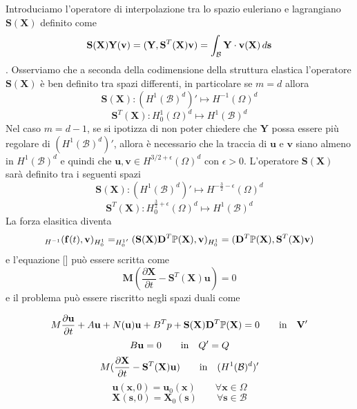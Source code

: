 Introduciamo l'operatore di interpolazione tra lo spazio euleriano e lagrangiano $\mathbf{S}(\mathbf{X})$ definito come
$$\mathbf{S}(\mathbf{X})\mathbf{Y}(\mathbf{v}) = \ps{\mathbf{Y}}{\mathbf{S}^T(\mathbf{X})\mathbf{v}} = \int_\mathcal{B}\mathbf{Y}\cdot\mathbf{v}(\mathbf{X})\, d\mathbf{s}$$.
Osserviamo che a seconda della codimensione della struttura elastica l'operatore $\mathbf{S}(\mathbf{X})$ è ben definito tra spazi differenti, in particolare se $m=d$ allora 
\begin{equation}
\mathbf{S}(\mathbf{X}):(H^1(\mathcal{B})^d)'\mapsto H^{-1}(\Omega)^d
\end{equation}
\begin{equation}
\mathbf{S}^T(\mathbf{X}):H^1_0(\Omega)^d\mapsto H^{1}(\mathcal{B})^d
\end{equation}
Nel caso $m=d-1$, se si ipotizza di non poter chiedere che $\mathbf{Y}$ possa essere più regolare di $(H^1(\mathcal{B})^d)'$, allora è necessario che la traccia di $\mathbf{u}$ e $\mathbf{v}$ siano almeno in $H^1(\mathcal{B})^d$ e quindi che $\mathbf{u},\mathbf{v}\in H^{3/2+\epsilon}(\Omega)^d$ con $\epsilon>0$.
L'operatore $\mathbf{S}(\mathbf{X})$ sarà definito tra i seguenti spazi
\begin{equation}
\mathbf{S}(\mathbf{X}):(H^1(\mathcal{B})^d)'\mapsto H^{-\frac{3}{2}-\epsilon}(\Omega)^d
\end{equation}
\begin{equation}
\mathbf{S}^T(\mathbf{X}):H^{\frac{3}{2}+\epsilon}_0(\Omega)^d\mapsto H^{1}(\mathcal{B})^d
\end{equation}
La forza elasitica diventa
\begin{equation}
\ps{\mathbf{f}(t)}{\mathbf{v}}[H^{-1}][H^1_0] = \ps{\mathbf{S}(\mathbf{X})\mathbf{D}^T\mathbb{P}(\mathbf{X})}{\mathbf{v}}[H^1_0]=\ps{\mathbf{D}^T\mathbb{P}(\mathbf{X})}{\mathbf{S}^T(\mathbf{X})\mathbf{v}}
\end{equation}
e l'equazione [] può essere scritta come
\begin{equation}
\mathbf{M}\left (\frac{\partial\mathbf{X}}{\partial t}-\mathbf{S}^T(\mathbf{X})\mathbf{u}\right )=0
\end{equation}
e il problema può essere riscritto negli spazi duali come
\begin{problem}
$$M\frac{\partial\mathbf{u}}{\partial t}+A\mathbf{u}+N(\mathbf{u})\mathbf{u}+B^{T}p+\mathbf{S}(\mathbf{X})\mathbf{D}^{T}\mathbb{P}(\mathbf{X})=0 \qquad \text{in\quad}\mathbf{V}'$$
$$B\mathbf{u}=0 \qquad \text{in\quad}Q'=Q$$
$$M(\frac{\partial \mathbf{X}}{\partial t}-\mathbf{S}^{T}(\mathbf{X})\mathbf{u}) \qquad \text{in\quad}(H^{1}(\mathcal{B})^{d})'$$
$$\mathbf{u}(\mathbf{x},0)=\mathbf{u}_{0}(\mathbf{x}) \qquad \forall\mathbf{x}\in\Omega$$
$$\mathbf{X}(\mathbf{s},0)=\mathbf{X}_{0}(\mathbf{s}) \qquad \forall\mathbf{s}\in\mathcal{B}$$
\end{problem}

